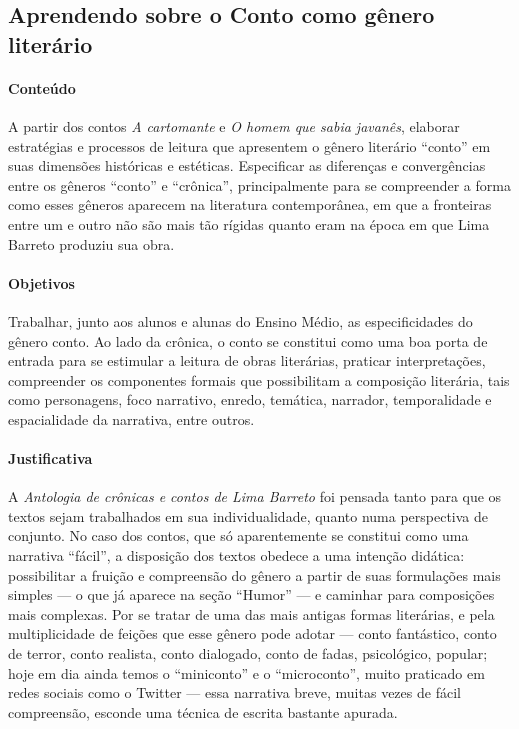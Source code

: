 \documentclass[11pt]{extarticle}
\begin{document}
{{\subsection{Aprendendo sobre o Conto como gênero literário}


\paragraph{Conteúdo} A partir dos contos \textit{\emph{A cartomante}} e
{\textit{O homem que sabia javanês}}, elaborar estratégias e
processos de leitura que apresentem o gênero literário ``conto'' em suas
dimensões históricas e estéticas. Especificar as diferenças e
convergências entre os gêneros ``conto'' e ``crônica'', principalmente
para se compreender a forma como esses gêneros aparecem na literatura
contemporânea, em que a fronteiras entre um e outro não são mais tão
rígidas quanto eram na época em que Lima Barreto produziu sua obra.

\paragraph{Objetivos} Trabalhar, junto aos alunos e alunas do Ensino
Médio, as especificidades do gênero conto. Ao lado da crônica, o conto
se constitui como uma boa porta de entrada para se estimular a leitura
de obras literárias, praticar interpretações, compreender os componentes
formais que possibilitam a composição literária, tais como personagens,
foco narrativo, enredo, temática, narrador, temporalidade e
espacialidade da narrativa, entre outros.


\paragraph{Justificativa} A \emph{Antologia de crônicas e contos de Lima
Barreto} foi pensada tanto para que os textos sejam trabalhados em sua
individualidade, quanto numa perspectiva de conjunto. No caso dos
contos, que só aparentemente se constitui como uma narrativa ``fácil'',
a disposição dos textos obedece a uma intenção didática: possibilitar a
fruição e compreensão do gênero a partir de suas formulações mais
simples --- o que já aparece na seção ``Humor'' --- e caminhar para
composições mais complexas. Por se tratar de uma das mais antigas formas
literárias, e pela multiplicidade de feições que esse gênero pode adotar
--- conto fantástico, conto de terror, conto realista, conto dialogado,
conto de fadas, psicológico, popular; hoje em dia ainda temos o
``miniconto'' e o ``microconto'', muito praticado em redes sociais como
o Twitter --- essa narrativa breve, muitas vezes de fácil compreensão,
esconde uma técnica de escrita bastante apurada.

}}
\end{document}

